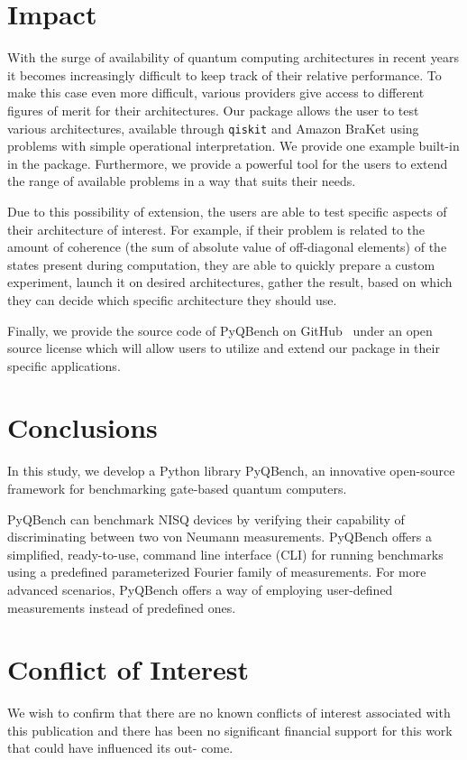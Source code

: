 \documentclass[preprint,12pt, a4paper, dvipsnames]{elsarticle}
\newcommand{\1}{{\rm 1\hspace{-0.9mm}l}}
\theoremstyle{definition}
\begin{document}
\section{Impact}
With the surge of availability of quantum computing architectures in recent
years it becomes increasingly difficult to keep track of their relative
performance. To make this case even more difficult, various providers give
access to different figures of merit for their architectures. Our package allows
the user to test various architectures, available through \texttt{qiskit} and
Amazon BraKet using problems with simple operational interpretation. We provide
one example built-in in the package. Furthermore, we provide a powerful tool for
the users to extend the range of available problems in a way that suits their
needs. 

Due to this possibility of extension, the users are able to test specific
aspects of their architecture of interest. For example, if their problem is
related to the amount of coherence (the sum of absolute value of off-diagonal
elements) of the states present during computation, they are able to quickly
prepare a custom experiment, launch it on desired architectures, gather the
result, based on which they can decide which specific architecture they should
use.

Finally, we provide the source code of PyQBench on GitHub~\cite{pyqbenchgithub} under an open
source license which will allow users to utilize and extend our package in their
specific applications.

\section{Conclusions}
\label{}

In this study, we develop  a Python library PyQBench, an innovative open-source framework for benchmarking
gate-based quantum computers.


PyQBench can benchmark NISQ devices by verifying their capability of
discriminating between two von Neumann measurements. PyQBench offers a simplified, ready-to-use,
command line interface (CLI) for running benchmarks using a predefined parameterized Fourier
family of measurements. For more advanced scenarios, PyQBench offers a way of employing user-defined
measurements instead of predefined ones.
\section{Conflict of Interest}
We wish to confirm that there are no known
conflicts of interest associated with this publication and there has been no
significant financial support for this work that could have influenced its out-
come.
\end{document}
